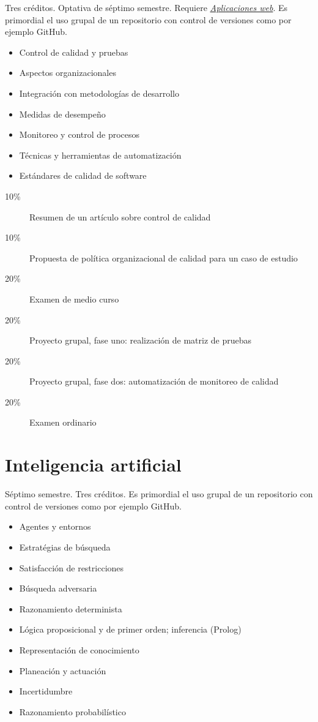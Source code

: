\documentclass{article}
\begin{document}
\begin{multicols}{4}
Tres cr\'{e}ditos. Optativa de s\'{e}ptimo semestre. Requiere
\hyperlink{aw}{\em Aplicaciones web}. Es primordial el uso grupal
de un repositorio con control de versiones como por ejemplo GitHub.

\begin{itemize}
\item{Control de calidad y pruebas}
\item{Aspectos organizacionales}
\item{Integraci\'{o}n con metodolog\'{i}as de desarrollo}
\item{Medidas de desempe\~{n}o}
\item{Monitoreo y control de procesos}
\item{T\'{e}cnicas y herramientas de automatizaci\'{o}n}
\item{Est\'{a}ndares de calidad de software}
\end{itemize}

\begin{description}
\item[10\%]{Resumen de un art\'{i}culo sobre control de calidad}
\item[10\%]{Propuesta de pol\'{i}tica organizacional de calidad para un
  caso de estudio}
\item[20\%]{Examen de medio curso}  
\item[20\%]{Proyecto grupal, fase uno: realizaci\'{o}n de matriz de pruebas}
\item[20\%]{Proyecto grupal, fase dos: automatizaci\'{o}n de monitoreo de calidad}  
\item[20\%]{Examen ordinario}
\end{description}  

\newpage

\hypertarget{ia}{\section*{Inteligencia artificial}}

S\'{e}ptimo semestre. Tres cr\'{e}ditos. Es primordial el uso grupal
de un repositorio con control de versiones como por ejemplo GitHub.

\begin{itemize}
\item{Agentes y entornos}
\item{Estrat\'{e}gias de b\'{u}squeda}
\item{Satisfacci\'{o}n de restricciones}
\item{B\'{u}squeda adversaria}
\item{Razonamiento determinista}
\item{L\'{o}gica proposicional y de primer orden; inferencia (Prolog)}
\item{Representaci\'{o}n de conocimiento}
\item{Planeaci\'{o}n y actuaci\'{o}n}
\item{Incertidumbre}
\item{Razonamiento probabil\'{i}stico}
\end{itemize}


\end{multicols}
\end{document}
